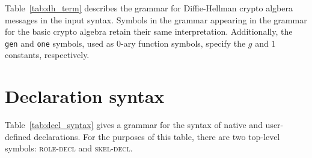 Table~\ref{tab:dh_term} describes the grammar for Diffie-Hellman
crypto algbera messages in the input syntax.  Symbols in the grammar
appearing in the grammar for the basic crypto algebra retain their
same interpretation.  Additionally, the \texttt{gen} and \texttt{one}
symbols, used as 0-ary function symbols, specify the $g$ and $1$
constants, respectively.

\begin{table}
\caption{{\cpsa} Diffie-Hellman Algebra Syntax}\label{tab:dh_term}
\end{table}
\section{Declaration syntax}
\label{sec:decl_syntax}

Table~\ref{tab:decl_syntax} gives a grammar for the syntax of native
and user-defined declarations.  For the purposes of this table, there
are two top-level symbols: \textsc{role-decl} and \textsc{skel-decl}.

